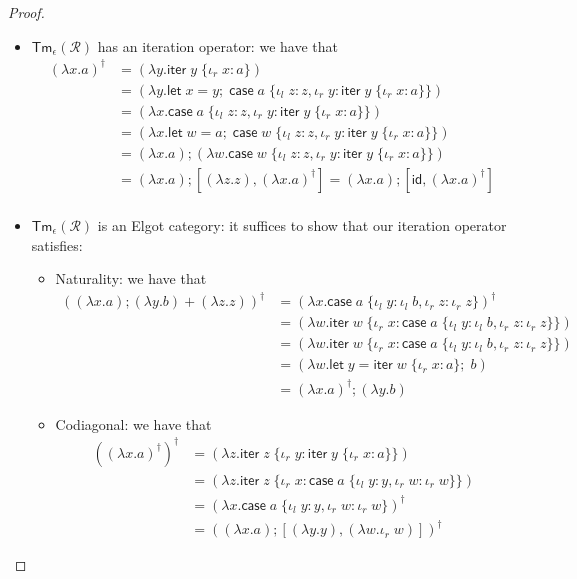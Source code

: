 \documentclass[acmsmall,screen,anonymous,review]{acmart}
\newcommand{\mc}[1]{\ensuremath{\mathcal{#1}}}
\newcommand{\ms}[1]{\ensuremath{\mathsf{#1}}}
\newcommand{\lto}{:}
\newcommand{\linl}[1]{\iota_l\;{#1}}
\newcommand{\linr}[1]{\iota_r\;{#1}}
\newcommand{\letexpr}[3]{\ensuremath{\ms{let}\;#1 = #2;\;#3}}
\newcommand{\caseexpr}[5]{\ms{case}\;#1\;\{\linl{#2} \lto #3, \linr{#4} \lto #5\}}
\newcommand{\liter}[3]{\ms{iter}\;#1\;\{ \linr{#2} \lto #3 \}}
\begin{document}
\begin{proof}
\begin{itemize}
\begin{align*}
    &= (\lambda (x, w) . (x, \caseexpr{w}{y}{\linl{y}}{z}{\linr{z}}))
    = (\lambda (x, w) . (x, w)) = \ms{id}_{X \otimes (Y + Z)}
  \end{align*}
  \item $\ms{Tm}_\epsilon(\mc{R})$ has an iteration operator: we have that
  \begin{align*}
    (\lambda x . a)^\dagger
    &= (\lambda y . \liter{y}{x}{a}) \\
    &= (\lambda y . \letexpr{x}{y}{\caseexpr{a}{z}{z}{y}{\liter{y}{x}{a}}}) \\
    &= (\lambda x . \caseexpr{a}{z}{z}{y}{\liter{y}{x}{a}}) \\
    &= (\lambda x . \letexpr{w}{a}{\caseexpr{w}{z}{z}{y}{\liter{y}{x}{a}}}) \\
    &= (\lambda x . a) ; (\lambda w . \caseexpr{w}{z}{z}{y}{\liter{y}{x}{a}}) \\
    &= (\lambda x . a) ; [(\lambda z.z), (\lambda x.a)^\dagger]
    = (\lambda x.a) ; [\ms{id}, (\lambda x.a)^\dagger] \\
  \end{align*}
  \item $\ms{Tm}_\epsilon(\mc{R})$ is an Elgot category: it suffices to show that our iteration
  operator satisfies:
  \begin{itemize}
    \item Naturality: we have that
    \begin{align*}
    ((\lambda x.a) ; (\lambda y.b) + (\lambda z.z))^\dagger 
    &= (\lambda x.\caseexpr{a}{y}{\linl{b}}{z}{\linr{z}})^\dagger \\
    &= (\lambda w.\liter{w}{x}{\caseexpr{a}{y}{\linl{b}}{z}{\linr{z}}}) \\
    &= (\lambda w.\liter{w}{x}{\caseexpr{a}{y}{\linl{b}}{z}{\linr{z}}}) \\
    &= (\lambda w.\letexpr{y}{\liter{w}{x}{a}}{b}) \\
    &= (\lambda x.a)^\dagger ; (\lambda y.b)
    \end{align*} 
    \item Codiagonal: we have that
    \begin{align*}
    ((\lambda x.a)^\dagger)^\dagger
    &= (\lambda z.\liter{z}{y}{\liter{y}{x}{a}}) \\
    &= (\lambda z.\liter{z}{x}{\caseexpr{a}{y}{y}{w}{\linr{w}}}) \\
    &= (\lambda x.\caseexpr{a}{y}{y}{w}{\linr{w}})^\dagger \\
    &= ((\lambda x.a) ; [(\lambda y.y), (\lambda w.\linr{w})])^\dagger

\end{align*}
\end{itemize}
\end{itemize}
\end{proof}
\end{document}
